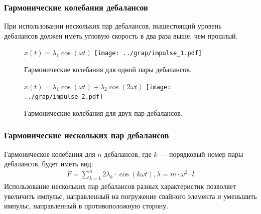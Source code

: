 \documentclass[10pt, pdf, hyperref={unicode}]{beamer}
\begin{document}
    \begin{frame}
        \frametitle{Гармонические колебания дебалансов}
        \begin{center}
            \begin{minipage}[h]{0.97\linewidth}
                При использовании нескольких пар дебалансов, вышестоящий уровень дебалансов должен иметь угловую скорость в два раза выше, чем прошлый.\\
                \newline
                \begin{minipage}[h]{0.44\linewidth}
                    \begin{figure}[h]
                        \centering
                        $x(t) = \lambda_1 \cos (\omega t)$
                        \texttt{[image: ../grap/impulse\_1.pdf]}
                        \caption{Гармонические колебания для одной пары дебалансов.}
                    \end{figure}
                \end{minipage}
                \hfill
                \begin{minipage}[h]{0.44\linewidth}
                    \begin{figure}[h]
                        \centering
                        $x(t) = \lambda_1 \cos (\omega t) + \lambda_2 \cos (2\omega t)$
                        \texttt{[image: ../grap/impulse\_2.pdf]}
                        \caption{Гармонические колебания для двух пар дебалансов.}
                    \end{figure}
                \end{minipage}
            \end{minipage}
        \end{center}
    \end{frame}

    \begin{frame}
        \frametitle{Гармонические нескольких пар дебалансов}
        \begin{center}
            \begin{minipage}[h]{0.97\linewidth}
                Гармоническое колебания для $n$ дебалансов, где $k$ --- порядковый номер пары дебалансов, будет иметь вид:
                \begin{equation}\label{eq:harmonic_sum}
                    \begin{gathered}
                        F = \sum\limits_{k = 1}^n 2 \lambda_k \cdot \cos (k \omega t), \lambda = m \cdot \omega^2 \cdot l
                    \end{gathered}
                \end{equation}
                Использование нескольких пар дебалансов разных характеристик позволяет увеличить импульс,
                направленный на погружение свайного элемента и уменьшить импульс, направленный в противоположную сторону.
            \end{minipage}
        \end{center}
    \end{frame}
\end{document}
